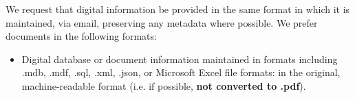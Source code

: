 \documentclass{article}
\newcommand{\AGENCY}{Department of State }
\begin{document}
We request that digital information be provided in the same format in which it is maintained, via email, preserving any metadata where possible. We prefer documents in the following formats:
\begin{itemize}
\item Digital database or document information maintained in formats including .mdb, .mdf, .sql, .xml, .json, or Microsoft Excel file formats: in the original, machine-readable format (i.e. if possible, \textbf{not converted to .pdf}). %

\end{itemize}



\end{document}
